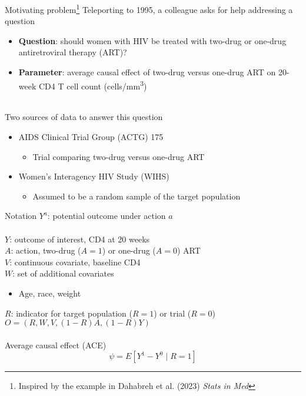 \documentclass{beamer}
\begin{document}
\begin{frame}{Motivating problem\footnote[frame]{Inspired by the example in Dahabreh et al. (2023) \textit{Stats in Med}}}
	Teleporting to 1995, a colleague asks for help addressing a question
	\begin{itemize}
		\item \textbf{Question}: should women with HIV be treated with two-drug or one-drug antiretroviral therapy (ART)?
		\item \textbf{Parameter}: average causal effect of two-drug versus one-drug ART on 20-week CD4 T cell count (cells/mm\textsuperscript{3})
	\end{itemize}
	~\\
	Two sources of data to answer this question
	\begin{itemize}
		\item AIDS Clinical Trial Group (ACTG) 175
		\begin{itemize}
			\item Trial comparing two-drug versus one-drug ART
		\end{itemize}
		\item Women's Interagency HIV Study (WIHS)
		\begin{itemize}
			\item Assumed to be a random sample of the target population
		\end{itemize}
	\end{itemize}
\end{frame}

\begin{frame}{Notation}
	$Y^a$: potential outcome under action $a$ \\~\\
	$Y$: outcome of interest, CD4 at 20 weeks \\
	$A$: action, two-drug ($A=1$) or one-drug ($A=0$) ART \\
	$V$: continuous covariate, baseline CD4 \\
	$W$: set of additional covariates
	\begin{itemize}
		\item Age, race, weight
	\end{itemize}
	$R$: indicator for target population ($R=1$) or trial ($R=0$) 
	$O = (R,W,V,(1-R)A, (1-R)Y)$
	\\~\\
	Average causal effect (ACE)
	\[\psi = E[Y^1 - Y^0 \mid R=1]\]
\end{frame}

\end{document}
